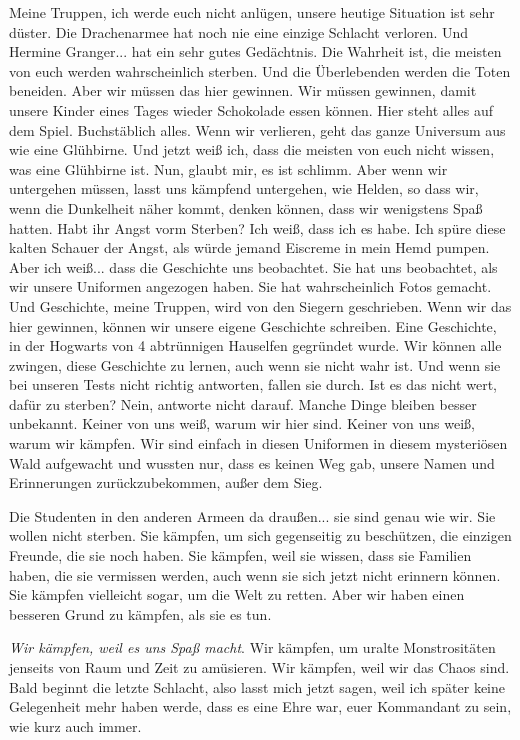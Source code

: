 Meine Truppen, ich werde euch nicht anlügen, unsere heutige Situation ist sehr
düster. Die Drachenarmee hat noch nie eine einzige Schlacht verloren. Und
Hermine Granger... hat ein sehr gutes Gedächtnis. Die Wahrheit ist, die meisten
von euch werden wahrscheinlich sterben. Und die Überlebenden werden die Toten
beneiden. Aber wir müssen das hier gewinnen. Wir müssen gewinnen, damit unsere
Kinder eines Tages wieder Schokolade essen können. Hier steht alles auf dem
Spiel. Buchstäblich alles. Wenn wir verlieren, geht das ganze Universum aus wie
eine Glühbirne. Und jetzt weiß ich, dass die meisten von euch nicht wissen, was
eine Glühbirne ist. Nun, glaubt mir, es ist schlimm. Aber wenn wir untergehen
müssen, lasst uns kämpfend untergehen, wie Helden, so dass wir, wenn die
Dunkelheit näher kommt, denken können, dass wir wenigstens Spaß hatten. Habt ihr
Angst vorm Sterben? Ich weiß, dass ich es habe. Ich spüre diese kalten Schauer
der Angst, als würde jemand Eiscreme in mein Hemd pumpen. Aber ich weiß... dass
die Geschichte uns beobachtet. Sie hat uns beobachtet, als wir unsere Uniformen
angezogen haben. Sie hat wahrscheinlich Fotos gemacht. Und Geschichte, meine
Truppen, wird von den Siegern geschrieben. Wenn wir das hier gewinnen, können
wir unsere eigene Geschichte schreiben. Eine Geschichte, in der Hogwarts von 4
abtrünnigen Hauselfen gegründet wurde. Wir können alle zwingen, diese Geschichte
zu lernen, auch wenn sie nicht wahr ist. Und wenn sie bei unseren Tests nicht
richtig antworten, fallen sie durch. Ist es das nicht wert, dafür zu sterben?
Nein, antworte nicht darauf. Manche Dinge bleiben besser unbekannt. Keiner von
uns weiß, warum wir hier sind. Keiner von uns weiß, warum wir kämpfen. Wir sind
einfach in diesen Uniformen in diesem mysteriösen Wald aufgewacht und wussten
nur, dass es keinen Weg gab, unsere Namen und Erinnerungen zurückzubekommen,
außer dem Sieg.

Die Studenten in den anderen Armeen da draußen... sie sind genau wie wir. Sie
wollen nicht sterben. Sie kämpfen, um sich gegenseitig zu beschützen, die
einzigen Freunde, die sie noch haben. Sie kämpfen, weil sie wissen, dass sie
Familien haben, die sie vermissen werden, auch wenn sie sich jetzt nicht
erinnern können. Sie kämpfen vielleicht sogar, um die Welt zu retten. Aber wir
haben einen besseren Grund zu kämpfen, als sie es tun.

\emph{Wir kämpfen, weil es uns Spaß macht}. Wir kämpfen, um uralte
Monstrositäten jenseits von Raum und Zeit zu amüsieren. Wir kämpfen, weil wir
das Chaos sind. Bald beginnt die letzte Schlacht, also lasst mich jetzt sagen,
weil ich später keine Gelegenheit mehr haben werde, dass es eine Ehre war, euer
Kommandant zu sein, wie kurz auch immer.

